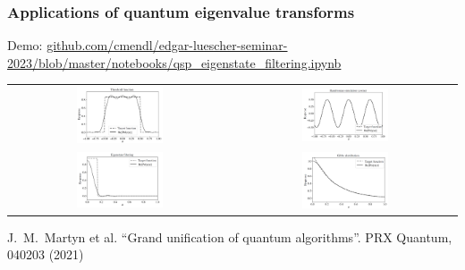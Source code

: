 \documentclass[t]{beamer}
\begin{document}
\begin{frame}
\frametitle{Applications of quantum eigenvalue transforms}
{\small Demo: {\href{https://github.com/cmendl/edgar-luescher-seminar-2023/blob/master/notebooks/qsp_eigenstate_filtering.ipynb}{github.com/cmendl/edgar-luescher-seminar-2023/blob/master/notebooks/qsp\_eigenstate\_filtering.ipynb}}}
\begin{table}
\begin{tabular}{cc}
\includegraphics[width=0.4\textwidth]{qsp_threshold_poly_approx.png} & \includegraphics[width=0.4\textwidth]{qsp_hamiltonian_simulation.png} \\
\includegraphics[width=0.4\textwidth]{qsp_eigenstate_filtering.png} & \includegraphics[width=0.4\textwidth]{qsp_gibbs.png}
\end{tabular}
\end{table}
\vspace{-1cm}
\footnotesize{%
{J.~M.~Martyn et al.} ``Grand unification of quantum algorithms''. PRX Quantum, 040203 (2021)\nocite{Martyn2021}%
}
\end{frame}
\end{document}
